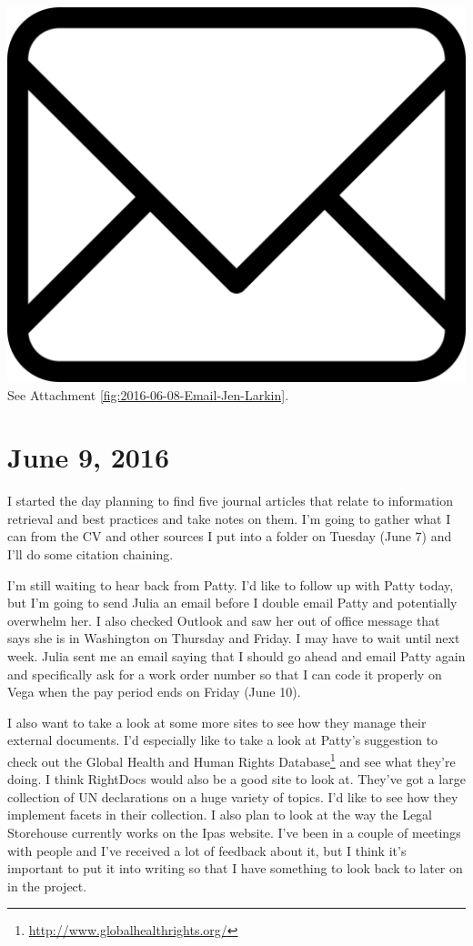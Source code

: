 \documentclass{article}
\begin{document}
\vspace{2em}
\noindent\includegraphics[height=\fontcharht\font`\B]{icons/attachment-email} See Attachment \ref{fig:2016-06-08-Email-Jen-Larkin}.
\vspace{2em}

\section{June 9, 2016}
I started the day planning to find five journal articles that relate to information retrieval and best practices and take notes on them. I'm going to gather what I can from the CV and other sources I put into a folder on Tuesday (June 7) and I'll do some citation chaining.

I'm still waiting to hear back from Patty. I'd like to follow up with Patty today, but I'm going to send Julia an email before I double email Patty and potentially overwhelm her. I also checked Outlook and saw her out of office message that says she is in Washington on Thursday and Friday. I may have to wait until next week. Julia sent me an email saying that I should go ahead and email Patty again and specifically ask for a work order number so that I can code it properly on Vega when the pay period ends on Friday (June 10).

I also want to take a look at some more sites to see how they manage their external documents. I'd especially like to take a look at Patty's suggestion to check out the Global Health and Human Rights Database\footnote{\url{http://www.globalhealthrights.org/}} and see what they're doing. I think RightDocs would also be a good site to look at. They've got a large collection of UN declarations on a huge variety of topics. I'd like to see how they implement facets in their collection. I also plan to look at the way the Legal Storehouse currently works on the Ipas website. I've been in a couple of meetings with people and I've received a lot of feedback about it, but I think it's important to put it into writing so that I have something to look back to later on in the project.
\end{document}
